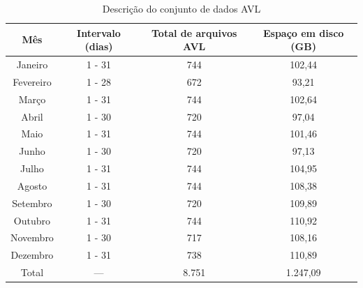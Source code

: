 \documentclass[
	12pt,				%
	oneside,			%
	a4paper,			%
	english,			%
	brazil				%
	]{abntex2ppgsi}
\begin{document}
{{{\begin{table}[!htb]
\begin{threeparttable}
\centering
\caption{Descrição do conjunto de dados AVL}
\label{tab:avlDataset}
\begin{tabular}{ c | c | c | c }
\toprule
\textbf{Mês} & \textbf{Intervalo (dias)} & \textbf{Total de arquivos AVL} & \textbf{Espaço em disco (GB)} \\
\midrule
Janeiro\tnote{a} & 1 - 31 & 744 & 102,44 \\
\hline
 Fevereiro & 1 - 28 & 672 & 93,21 \\
\hline
 Março & 1 - 31 & 744 & 102,64 \\
\hline
 Abril & 1 - 30 & 720 & 97,04 \\
\hline
 Maio & 1 - 31 & 744 & 101,46 \\
\hline
 Junho & 1 - 30 & 720 & 97,13 \\
\hline
 Julho & 1 - 31 & 744 & 104,95 \\
\hline
 Agosto & 1 - 31 & 744 & 108,38 \\
\hline
 Setembro & 1 - 30 & 720 & 109,89 \\
\hline
 Outubro & 1 - 31 & 744 & 110,92 \\
\hline
 Novembro & 1 - 30 & 717 & 108,16 \\
\hline
 Dezembro & 1 - 31 & 738 & 110,89 \\
\midrule
\midrule
Total & --- & 8.751 & 1.247,09 \\
\bottomrule
\end{tabular}
\begin{tablenotes}

\end{tablenotes}
\end{threeparttable}
\end{table}}}}
\end{document}
